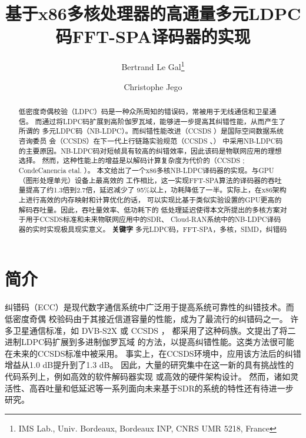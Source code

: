 \documentclass{cjc}
\begin{document}
\title{基于x86多核处理器的高通量多元LDPC码FFT-SPA译码器的实现}
\author{Bertrand Le Gal\footnote{IMS Lab., Univ. Bordeaux, Bordeaux INP, CNRS UMR 5218, France} \and Christophe Jego\footnotemark[1]}

\maketitle

\begin{abstract}
  低密度奇偶校验（LDPC）码是一种众所周知的错误码，常被用于无线通信和卫星通信。
  而通过将LDPC码扩展到高阶伽罗瓦域，能够进一步提高其纠错性能，从而产生了所谓的
  多元LDPC码（NB-LDPC）。而纠错性能改进（CCSDS \citeyear{CCSDS_2014}）是国际空间数据系统咨询委员
  会（CCSDS）在下一代上行链路实验规范（CCSDS \citeyear{CCSDS_2014}、\citeyear{CCSDS_2015}）
  中采用NB-LDPC码的主要原因。NB-LDPC码对短帧具有较高的纠错效率，因此该码是物联网应用的理想选择。
  然而，这种性能上的增益是以解码计算复杂度为代价的（CCSDS \citeyear{CCSDS_2014}; CondeCanencia etal. \citeyear{comparison_NBLDPC}）。
  本文给出了一个x86多核NB-LDPC译码器的实现。与GPU（图形处理单元）设备上最高效的
  工作相比，这一实现FFT-SPA算法的译码器的吞吐量提高了约1.3倍到2.7倍，延迟减少了
  95\%以上，功耗降低了一半。实际上，在x86架构上进行高效的内存映射和计算优化的话，
  可以实现比基于类似实验设置的GPU更高的解码吞吐量。因此，吞吐量效率、低功耗下的
  低处理延迟使得本文所提出的多核方案对于用于CCSDS标准和未来物联网应用中的SDR、
  Cloud-RAN系统中的NB-LDPC译码器的实时实现极具现实意义。\medskip\newline
  \textbf{关键字 }多元LDPC码，FFT-SPA，多核，SIMD，纠错码

\end{abstract}

\section{简介}

  纠错码（ECC）是现代数字通信系统中广泛用于提高系统可靠性的纠错技术。而低密度奇偶
  校验码\cite{gallager_low_1962}由于其接近信道容量的性能，成为了最流行的纠错码之一。
  许多卫星通信标准，如 DVB-S2X \cite{noauthor_dvb_nodate} 或 CCSDS \cite{CCSDS_2011}，
  都采用了这种码族。文\cite{davey_low_1998,noauthor_barnault_nodate}提出了将二进制LDPC码扩展到多进制伽罗瓦域
  的方法，以提高纠错性能。这类方法很可能在未来的CCSDS标准中被采用\cite{CCSDS_2015,dolecek_non-binary_2014}。
  事实上，在CCSDS环境中，应用该方法后的纠错增益从1.0 dB提升到了1.3 dB\cite{CCSDS_2015}。
  因此，大量的研究集中在这一新的具有挑战性的代码系列上，例如高效的软件解码器实现\cite{noauthor_wang_nodate,noauthor_andrade_nodate,noauthor_beermann_nodate,andrade_optimized_2014,noauthor_thi_nodate,beermann_gpu_2015,noauthor_pham_nodate,liu_high-throughput_2018}
  或高效的硬件架构设计\cite{boutillon_design_2013,abassi_novel_2017}。
  然而，诸如灵活性、高吞吐量和低延迟等一系列面向未来基于SDR的系统的特性还有待进一步研究。
\end{document}
